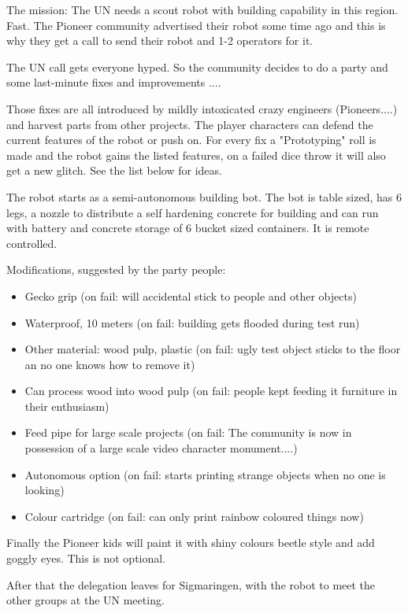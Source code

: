 The mission: The UN needs a scout robot with building capability in this region. Fast. The Pioneer community advertised their robot some time ago and this is why they get a call to send their robot and 1-2 operators for it.

The UN call gets everyone hyped. So the community decides to do a party and some last-minute fixes and improvements ....

Those fixes are all introduced by mildly intoxicated crazy engineers (Pioneers....) and harvest parts from other projects. The player characters can defend the current features of the robot or push on. For every fix a "Prototyping" roll is made and the robot gains the listed features, on a failed dice throw it will also get a new glitch. See the list below for ideas.

The robot starts as a semi-autonomous building bot. The bot is table sized, has 6 legs, a nozzle to distribute a self hardening concrete for building and can run with battery and concrete storage of 6 bucket sized containers. It is remote controlled.

Modifications, suggested by the party people:

\begin{itemize}
    \item Gecko grip (on fail: will accidental stick to people and other objects)
    \item Waterproof, 10 meters (on fail: building gets flooded during test run)
    \item Other material: wood pulp, plastic (on fail: ugly test object sticks to the floor an no one knows how to remove it)
    \item Can process wood into wood pulp (on fail: people kept feeding it furniture in their enthusiasm)
    \item Feed pipe for large scale projects (on fail: The community is now in possession of a large scale video character monument....)
    \item Autonomous option (on fail: starts printing strange objects when no one is looking)
    \item Colour cartridge (on fail: can only print rainbow coloured things now)
\end{itemize}

Finally the Pioneer kids will paint it with shiny colours beetle style and add goggly eyes. This is not optional.

After that the delegation leaves for Sigmaringen, with the robot to meet the other groups at the UN meeting.

